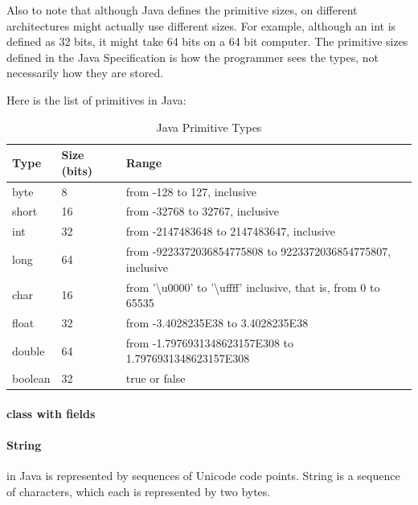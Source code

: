\documentclass[fleqn,10pt]{SelfArx} %
\begin{document}
Also to note that although Java defines the primitive sizes, on different architectures might actually use different sizes. For example, although an int is defined as 32 bits, it might take 64 bits on a 64 bit computer. The primitive sizes defined in the Java Specification is how the programmer sees the types, not necessarily how they are stored.

Here is the list of primitives in Java\cite{gosling}:
\begin{table}[!htb]
\centering
\begin{tabulary}{\columnwidth}{ | p{0.1\columnwidth} | p{0.15\columnwidth} | p{0.55\columnwidth} |}
\hline
\textbf{Type} & \textbf{Size (bits)} & \textbf{Range} \\ \hline 
byte  & 8  & from -128 to 127, inclusive \\ \hline 
short & 16 & from -32768 to 32767, inclusive \\ \hline 
int   & 32 & from -2147483648 to 2147483647, inclusive \\ \hline 
long  & 64 & from -9223372036854775808 to 9223372036854775807, inclusive \\ \hline
char  & 16 & from '\textbackslash{}u0000' to '\textbackslash{}uffff' inclusive, that is, from 0 to 65535 \\ \hline 
float & 32 & from -3.4028235E38 to 3.4028235E38\footnotemark[3] \\ \hline
double & 64 &from -1.7976931348623157E308 to 1.7976931348623157E308\footnotemark[3] \\ \hline
boolean & 32\footnotemark[4] & true or false \\ \hline

\end{tabulary}

\caption{Java Primitive Types}\label{tab:java-primitive-types}
\end{table}


\paragraph{class with fields}
\paragraph{String} in Java is represented by sequences of Unicode code points. String is a sequence of characters, which each is represented by two bytes. 
\end{document}
